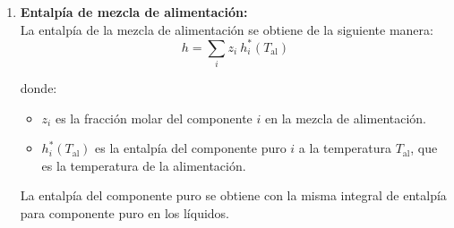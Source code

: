 \begin{enumerate}
    \item \textbf{Entalpía de mezcla de alimentación:}\\
          La entalpía de la mezcla de alimentación se obtiene de la siguiente manera:
          $$
              h = \sum_i z_i\ h^*_i(T_{\text{al}})
          $$

          donde:
          \begin{itemize}
              \item $z_i$ es la fracción molar del componente $i$ en la mezcla de alimentación.
              \item $h^*_i(T_{\text{al}})$ es la entalpía del componente puro $i$ a la temperatura $T_{\text{al}}$, que es la temperatura de la alimentación.
          \end{itemize}

          La entalpía del componente puro se obtiene con la misma integral de entalpía para componente puro en los líquidos.
\end{enumerate}
